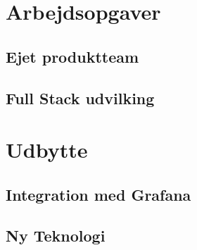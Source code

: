 \documentclass[a4paper]{article}
\begin{document}
\section{Arbejdsopgaver}
\subsection{Ejet produktteam}
\subsection{Full Stack udvilking}

\section{Udbytte}
\subsection{Integration med Grafana}
\subsection{Ny Teknologi}
\end{document}
